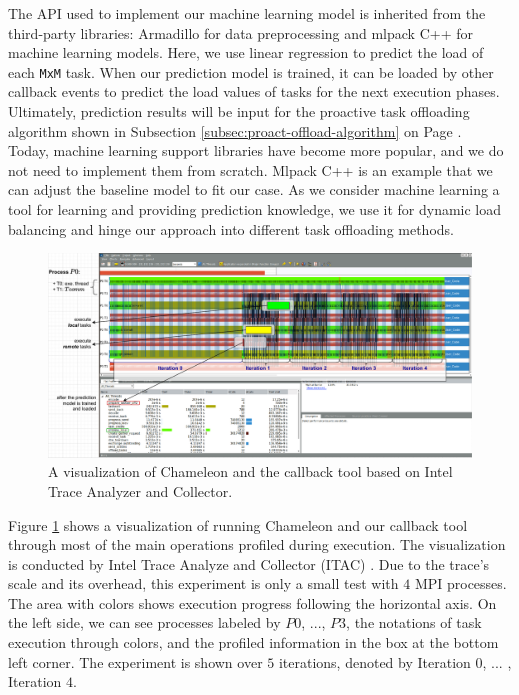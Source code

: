 The API used to implement our machine learning model is inherited from the third-party libraries: Armadillo \cite{anderson2016armadillo} \cite{sanderson2018userfriend} for data preprocessing and mlpack C++ \cite{curtin2013mlpack} \cite{curtin2023mlpack4} for machine learning models. Here, we use linear regression to predict the load of each \texttt{MxM} task. When our prediction model is trained, it can be loaded by other callback events to predict the load values of tasks for the next execution phases. Ultimately, prediction results will be input for the proactive task offloading algorithm shown in Subsection \ref{subsec:proact-offload-algorithm} on Page \pageref{subsec:proact-offload-algorithm}.\\

Today, machine learning support libraries have become more popular, and we do not need to implement them from scratch. Mlpack C++ \cite{curtin2023mlpack4} is an example that we can adjust the baseline model to fit our case. As we consider machine learning a tool for learning and providing prediction knowledge, we use it for dynamic load balancing and hinge our approach into different task offloading methods.\\

\newpage

\begin{figure}[t]
	\centering
	\includegraphics[scale=0.5125]{./pictures/poc_implementation/poc_visualize_trace_proactlb_off2.pdf}
	\caption{A visualization of Chameleon and the callback tool based on Intel Trace Analyzer and Collector.}
	\label{fig:poc_visualize_chamtool_trace_itac}
\end{figure}

Figure \ref{fig:poc_visualize_chamtool_trace_itac} shows a visualization of running Chameleon and our callback tool through most of the main operations profiled during execution. The visualization is conducted by Intel Trace Analyze and Collector (ITAC) \cite{wrinn2004mpiitac}. Due to the trace's scale and its overhead, this experiment is only a small test with $4$ MPI processes. The area with colors shows execution progress following the horizontal axis. On the left side, we can see processes labeled by $P0$, $...$, $P3$, the notations of task execution through colors, and the profiled information in the box at the bottom left corner. The experiment is shown over $5$ iterations, denoted by Iteration $0$, ... , Iteration $4$.\\

